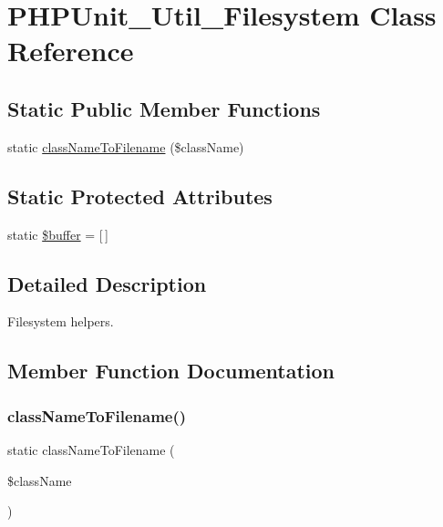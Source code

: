 \hypertarget{class_p_h_p_unit___util___filesystem}{}\section{P\+H\+P\+Unit\+\_\+\+Util\+\_\+\+Filesystem Class Reference}
\label{class_p_h_p_unit___util___filesystem}
\subsection*{Static Public Member Functions}
\begin{DoxyCompactItemize}
\item 
static \mbox{\hyperlink{class_p_h_p_unit___util___filesystem_a0bc4583fdcb801805988b3a9fee1159f}{class\+Name\+To\+Filename}} (\$class\+Name)
\end{DoxyCompactItemize}
\subsection*{Static Protected Attributes}
\begin{DoxyCompactItemize}
\item 
static \mbox{\hyperlink{class_p_h_p_unit___util___filesystem_af1862006a19e84e552f66189adc792ae}{\$buffer}} = \mbox{[}$\,$\mbox{]}
\end{DoxyCompactItemize}


\subsection{Detailed Description}
Filesystem helpers. 

\subsection{Member Function Documentation}
\mbox{\label{class_p_h_p_unit___util___filesystem_a0bc4583fdcb801805988b3a9fee1159f}} 
\subsubsection{\texorpdfstring{class\+Name\+To\+Filename()}{classNameToFilename()}}
{\footnotesize\ttfamily static class\+Name\+To\+Filename (\begin{DoxyParamCaption}\item[{}]{\$class\+Name }\end{DoxyParamCaption})\hspace{0.3cm}{\ttfamily [static]}}

